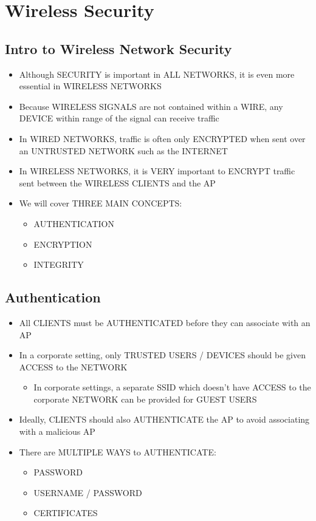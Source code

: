 \chapter{Wireless Security}\label{wireless-security}

\section{Intro to Wireless Network
Security}\label{intro-to-wireless-network-security}

\begin{itemize}
\item
  Although SECURITY is important in ALL NETWORKS, it is even more
  essential in WIRELESS NETWORKS
\item
  Because WIRELESS SIGNALS are not contained within a WIRE, any DEVICE
  within range of the signal can receive traffic
\item
  In WIRED NETWORKS, traffic is often only ENCRYPTED when sent over an
  UNTRUSTED NETWORK such as the INTERNET
\item
  In WIRELESS NETWORKS, it is VERY important to ENCRYPT traffic sent
  between the WIRELESS CLIENTS and the AP
\item
  We will cover THREE MAIN CONCEPTS:

  \begin{itemize}
  \tightlist
  \item
    AUTHENTICATION
  \item
    ENCRYPTION
  \item
    INTEGRITY
  \end{itemize}
\end{itemize}

\section{Authentication}\label{authentication}

\begin{itemize}
\tightlist
\item
  All CLIENTS must be AUTHENTICATED before they can associate with an AP
\item
  In a corporate setting, only TRUSTED USERS / DEVICES should be given
  ACCESS to the NETWORK

  \begin{itemize}
  \tightlist
  \item
    In corporate settings, a separate SSID which doesn't have ACCESS to
    the corporate NETWORK can be provided for GUEST USERS
  \end{itemize}
\item
  Ideally, CLIENTS should also AUTHENTICATE the AP to avoid associating
  with a malicious AP
\item
  There are MULTIPLE WAYS to AUTHENTICATE:

  \begin{itemize}
  \tightlist
  \item
    PASSWORD
  \item
    USERNAME / PASSWORD
  \item
    CERTIFICATES
  \end{itemize}
\end{itemize}

